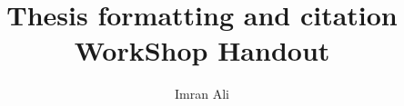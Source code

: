 \documentclass[a4paper]{article}
\title{Thesis formatting and citation WorkShop Handout}
\author{Imran Ali}
\begin{document}
\maketitle
\renewcommand\contentsname{Table of Contents} %
\setcounter{tocdepth}{2} %
\tableofcontents 
{} %

\renewcommand\listfigurename{LIST OF FIGURES} %
\listoffigures 
{}
\renewcommand\listtablename{LIST OF TABLES} %
\listoftables 
{}
 
 
\end{document}
